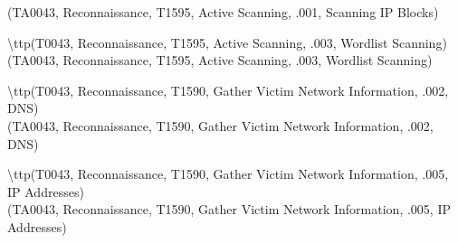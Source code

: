 \documentclass[notitlepage]{article}
\begin{document}
	\ttp(TA0043, Reconnaissance, T1595, Active Scanning, .001, Scanning IP Blocks)
	
	\indent\textbackslash ttp(T0043, Reconnaissance, T1595, Active Scanning, .003, Wordlist Scanning) \\
	
	\ttp(TA0043, Reconnaissance, T1595, Active Scanning, .003, Wordlist Scanning)
	
	\indent\textbackslash ttp(T0043, Reconnaissance, T1590, Gather Victim Network Information, .002, DNS) \\
	
	\ttp(TA0043, Reconnaissance, T1590, Gather Victim Network Information, .002, DNS)
	
	\indent\textbackslash ttp(T0043, Reconnaissance, T1590, Gather Victim Network Information, .005, IP Addresses) \\
	
	\ttp(TA0043, Reconnaissance, T1590, Gather Victim Network Information, .005, IP Addresses)
\end{document}
